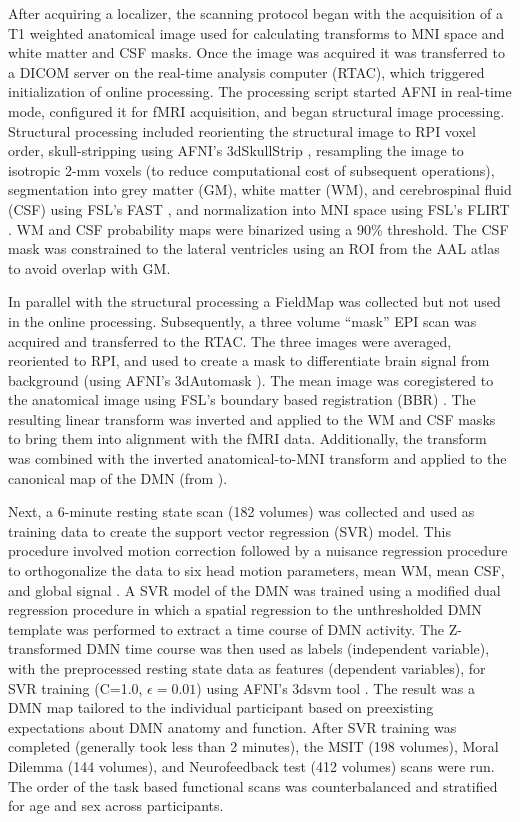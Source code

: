 After acquiring a localizer, the scanning protocol began with the acquisition of a T1 weighted anatomical image used for calculating transforms to MNI space and white matter and CSF masks. Once the image was acquired it was transferred to a DICOM server on the real-time analysis computer (RTAC), which triggered initialization of online processing. The processing script started AFNI in real-time mode, configured it for fMRI acquisition, and began structural image processing. Structural processing included reorienting the structural image to RPI voxel order, skull-stripping using AFNI’s 3dSkullStrip \cite{Cox1996}, resampling the image to isotropic 2-mm voxels (to reduce computational cost of subsequent operations), segmentation into grey matter (GM), white matter (WM), and cerebrospinal fluid (CSF) using FSL’s FAST \cite{Zhang2001}, and normalization into MNI space using FSL’s FLIRT \cite{Jenkinson2002,Jenkinson2001}. WM and CSF probability maps were binarized using a 90\% threshold. The CSF mask was constrained to the lateral ventricles using an ROI from the AAL atlas to avoid overlap with GM.

In parallel with the structural processing a FieldMap was collected but not used in the online processing. Subsequently, a three volume “mask” EPI scan was acquired and transferred to the RTAC. The three images were averaged, reoriented to RPI, and used to create a mask to differentiate brain signal from background (using AFNI’s 3dAutomask \cite{Cox1996}). The mean image was coregistered to the anatomical image using FSL’s boundary based registration (BBR) \cite{Greve2009}. The resulting linear transform was inverted and applied to the WM and CSF masks to bring them into alignment with the fMRI data. Additionally, the transform was combined with the inverted anatomical-to-MNI transform and applied to the canonical map of the DMN (from \cite{Smith2009}).

Next, a 6-minute resting state scan (182 volumes) was collected and used as training data to create the support vector regression (SVR) model. This procedure involved motion correction followed by a nuisance regression procedure to orthogonalize the data to six head motion parameters, mean WM, mean CSF, and global signal \cite{Friston1996,Fox2005,Lund2006}. A SVR model of the DMN was trained using a modified dual regression procedure in which a spatial regression to the unthresholded DMN template was performed to extract a time course of DMN activity. The Z-transformed DMN time course was then used as labels (independent variable), with the preprocessed resting state data as features (dependent variables), for SVR training (C=1.0, $\epsilon = 0.01$) using AFNI’s 3dsvm tool \cite{LaConte2005}. The result was a DMN map tailored to the individual participant based on preexisting expectations about DMN anatomy and function. After SVR training was completed (generally took less than 2 minutes), the MSIT (198 volumes), Moral Dilemma (144 volumes), and Neurofeedback test (412 volumes) scans were run. The order of the task based functional scans was counterbalanced and stratified for age and sex across participants.

